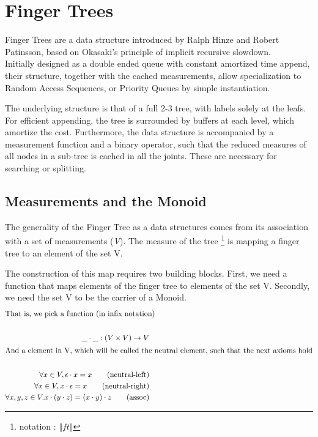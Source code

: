 \documentclass[12pt,twoside,notitlepage]{report}
\begin{document}
\section{Finger Trees} 

	Finger Trees are a data structure introduced by Ralph Hinze and Robert Patinsson, based on Okasaki's principle of implicit recursive slowdown. \\ 
Initially designed as a double ended queue with constant amortized time append, their structure, together with the cached measurements, allow specialization to Random Access Sequences, or Priority Queues by simple instantiation.  
 
 	The underlying structure is that of a full 2-3 tree, with labels solely at the leafs. For efficient appending, the tree is surrounded by buffers at each level, which amortize the cost. Furthermore, the data structure is accompanied by a measurement function and a binary operator, such that the reduced measures of all nodes in a sub-tree is cached in all the joints. These are necessary for searching or splitting.

\subsection{Measurements and the Monoid}

The generality of the Finger Tree as a data structures comes from its association with a set of measurements (\textit{V}). The measure of the tree \footnote{notation : $\Vert ft \Vert$} is mapping a finger tree to an element of the set V.

The construction of this map requires two building blocks. First, we need a function that maps elements of the finger tree to elements of the set V. Secondly, we need the set V to be the carrier of a Monoid.
\begin{align*}
\intertext{That is, we pick a function (in infix notation)} \\ 
	\_\cdot\_ : (V \times V) \to V \\ 
\intertext{And a element in V, which will be called the neutral element, such that the next axioms hold} \\
	\forall	x \in V, \epsilon \cdot x = x  \tag{neutral-left}\\
	\forall x \in V, x \cdot \epsilon = x  \tag{neutral-right} \\
	\forall x, y,z \in V. x \cdot (y \cdot z) = (x \cdot y) \cdot z \tag{assoc} \\
\end{align*}
\end{document}
